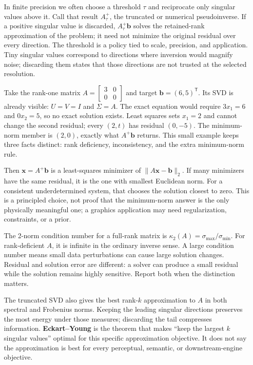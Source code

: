 In finite precision we often choose a threshold \(\tau\) and reciprocate only singular values above it. Call that result \(A_\tau^+\), the truncated or numerical pseudoinverse. If a positive singular value is discarded, \(A_\tau^+\mathbf b\) solves the retained-rank approximation of the problem; it need not minimize the original residual over every direction. The threshold is a policy tied to scale, precision, and application. Tiny singular values correspond to directions where inversion would magnify noise; discarding them states that those directions are not trusted at the selected resolution.

Take the rank-one matrix \(A=\begin{bmatrix}3&0\\0&0\end{bmatrix}\) and target \(\mathbf b=(6,5)^\mathsf T\). Its SVD is already visible: \(U=V=I\) and \(\Sigma=A\). The exact equation would require \(3x_1=6\) and \(0x_2=5\), so no exact solution exists. Least squares sets \(x_1=2\) and cannot change the second residual; every \((2,t)\) has residual \((0,-5)\). The minimum-norm member is \((2,0)\), exactly what \(A^+\mathbf b\) returns. This small example keeps three facts distinct: rank deficiency, inconsistency, and the extra minimum-norm rule.

Then \(\mathbf x=A^+\mathbf b\) is a least-squares minimizer of \(\|A\mathbf x-\mathbf b\|_2\). If many minimizers have the same residual, it is the one with smallest Euclidean norm. For a consistent underdetermined system, that chooses the solution closest to zero. This is a principled choice, not proof that the minimum-norm answer is the only physically meaningful one; a graphics application may need regularization, constraints, or a prior.

The 2-norm condition number for a full-rank matrix is \(\kappa_2(A)=\sigma_{\max}/\sigma_{\min}\). For rank-deficient \(A\), it is infinite in the ordinary inverse sense. A large condition number means small data perturbations can cause large solution changes. Residual and solution error are different: a solver can produce a small residual while the solution remains highly sensitive. Report both when the distinction matters.

The truncated SVD also gives the best rank-\(k\) approximation to \(A\) in both spectral and Frobenius norms. Keeping the leading singular directions preserves the most energy under those measures; discarding the tail compresses information. \textbf{Eckart--Young} is the theorem that makes ``keep the largest \(k\) singular values'' optimal for this specific approximation objective. It does not say the approximation is best for every perceptual, semantic, or downstream-engine objective.

